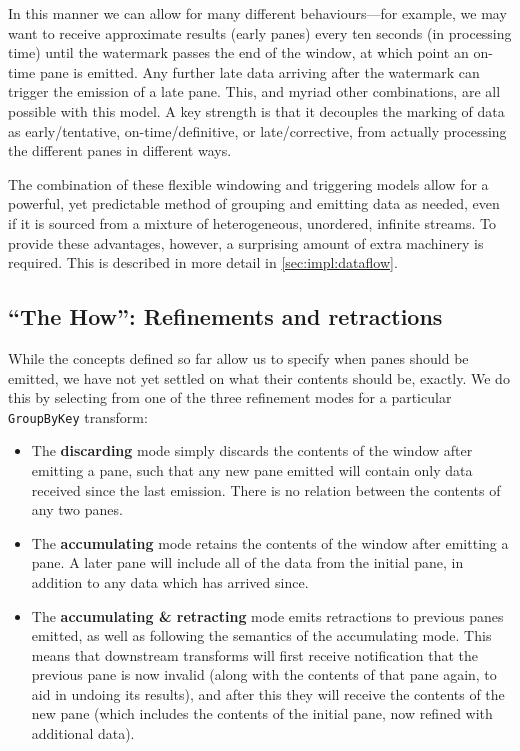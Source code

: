 In this manner we can allow for many different behaviours---for example, we may want to receive approximate results (early panes) every ten seconds (in processing time) until the watermark passes the end of the window, at which point an on-time pane is emitted.
Any further late data arriving after the watermark can trigger the emission of a late pane.
This, and myriad other combinations, are all possible with this model.
A key strength is that it decouples the marking of data as early/tentative, on-time/definitive, or late/corrective, from actually processing the different panes in different ways.


The combination of these flexible windowing and triggering models allow for a powerful, yet predictable method of grouping and emitting data as needed, even if it is sourced from a mixture of heterogeneous, unordered, infinite streams.
To provide these advantages, however, a surprising amount of extra machinery is required.
This is described in more detail in \cref{sec:impl:dataflow}.

\subsection{``The How'': Refinements and retractions}\label{sec:prep:dataflow:how}

While the concepts defined so far allow us to specify when panes should be emitted, we have not yet settled on what their contents should be, exactly.
We do this by selecting from one of the three refinement modes for a particular \verb|GroupByKey| transform:
\begin{itemize}
	\item The \textbf{discarding} mode simply discards the contents of the window after emitting a pane, such that any new pane emitted will contain only data received since the last emission. There is no relation between the contents of any two panes.
	\item The \textbf{accumulating} mode retains the contents of the window after emitting a pane. A later pane will include all of the data from the initial pane, in addition to any data which has arrived since.
	\item The \textbf{accumulating \& retracting} mode emits retractions to previous panes emitted, as well as following the semantics of the accumulating mode. This means that downstream transforms will first receive notification that the previous pane is now invalid (along with the contents of that pane again, to aid in undoing its results), and after this they will receive the contents of the new pane (which includes the contents of the initial pane, now refined with additional data). 
\end{itemize}


